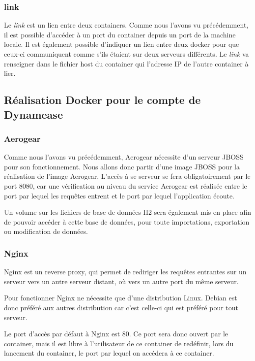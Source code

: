 \subsubsection{link}

Le \textit{link} est un lien entre deux containers. Comme nous l'avons vu précédemment, il est possible d'accéder à un port du container depuis un port de la machine locale. Il est également possible d'indiquer un lien entre deux docker pour que ceux-ci communiquent comme s'ils étaient sur deux serveurs différents. Le \textit{link} va renseigner dans le fichier host du container qui l'adresse IP de l'autre container à lier.

\subsection{Réalisation Docker pour le compte de Dynamease}

\subsubsection{Aerogear}

Comme nous l'avons vu précédemment, Aerogear nécessite d'un serveur JBOSS pour son fonctionnement. Nous allons donc partir d'une image JBOSS pour la réalisation de l'image Aerogear. L'accès à se serveur se fera obligatoirement par le port 8080, car une vérification au niveau du service Aerogear est réalisée entre le port par lequel les requêtes entrent et le port par lequel l'application écoute.

Un volume sur les fichiers de base de données H2 sera également mis en place afin de pouvoir accéder à cette base de données, pour toute importations, exportation ou modification de données. 

\subsubsection{Nginx}

Nginx est un reverse proxy, qui permet de rediriger les requêtes entrantes sur un serveur vers un autre serveur distant, où vers un autre port du même serveur.

Pour fonctionner Nginx ne nécessite que d'une distribution Linux. Debian est donc préféré aux autres distribution car c'est celle-ci qui est préféré pour tout serveur.

Le port d'accès par défaut à Nginx est 80. Ce port sera donc ouvert par le container, mais il est libre à l'utilisateur de ce container de redéfinir, lors du lancement du container, le port par lequel on accédera à ce container.

